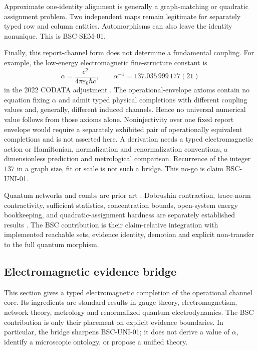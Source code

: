 \documentclass[11pt,a4paper]{article}
\theoremstyle{definition}
\theoremstyle{plain}
\theoremstyle{remark}
\begin{document}
Approximate one-identity alignment is generally a graph-matching or quadratic
assignment problem.  Two independent maps remain legitimate for separately
typed row and column entities.  Automorphisms can also leave the identity
nonunique.  This is BSC-SEM-01.

Finally, this report-channel form does not determine a fundamental coupling.
For example, the low-energy electromagnetic fine-structure constant is
\[
\alpha=\frac{e^2}{4\pi\varepsilon_0\hbar c},
\qquad
\alpha^{-1}=137.035\,999\,177(21)
\]
in the 2022 CODATA adjustment \citep{mohr2025codata}.  The
operational-envelope axioms contain no equation fixing \(\alpha\) and admit
typed physical completions with different coupling values and, generally,
different induced channels.  Hence no universal numerical value follows from
those axioms alone.  Noninjectivity over one fixed report envelope would
require a separately exhibited pair of operationally equivalent completions
and is not asserted here.  A derivation needs a typed electromagnetic action
or Hamiltonian, normalization and renormalization conventions, a
dimensionless prediction and metrological comparison.  Recurrence of the
integer \(137\) in a graph size, fit or scale is not such a bridge.  This
no-go is claim BSC-UNI-01.

Quantum networks and combs are prior art \citep{chiribella2009}.  Dobrushin
contraction, trace-norm contractivity, sufficient statistics, concentration
bounds, open-system energy bookkeeping, and quadratic-assignment hardness are
separately established results
\citep{dobrushin1956,perezgarcia2006,fisher1922,hoeffding1963,alicki1979,sahnigonzalez1976}.
The BSC contribution is their claim-relative integration with implemented
reachable sets, evidence identity, demotion and explicit non-transfer to the
full quantum morphism.

\subsection{Electromagnetic evidence bridge}
\label{sec:em-bridge}

This section gives a typed electromagnetic completion of the operational
channel core.  Its ingredients are standard results in gauge theory,
electromagnetism, network theory, metrology and renormalized quantum
electrodynamics.  The BSC contribution is only their placement on explicit
evidence boundaries.  In particular, the bridge sharpens BSC-UNI-01; it does
not derive a value of \(\alpha\), identify a microscopic ontology, or propose
a unified theory.
\end{document}

